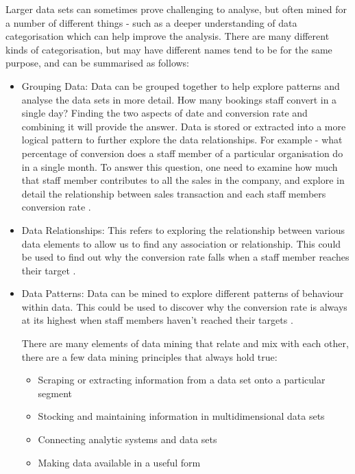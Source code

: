 Larger data sets can sometimes prove challenging to analyse, but often mined for a number of different things - such as a deeper understanding of data categorisation which can help improve the analysis. There are many different kinds of categorisation, but may have different names tend to be for the same purpose, and can be summarised as follows:

\begin{itemize}
\item Grouping Data: Data can be grouped together to help explore patterns and analyse the data sets in more detail. How many bookings staff convert in a single day? Finding the two aspects of date and conversion rate and combining it will provide the answer. Data is stored or extracted into a more logical pattern to further explore the data relationships. For example - what percentage of conversion does a staff member of a particular organisation do in a single month. To answer this question, one need to examine how much that staff member contributes to all the sales in the company, and explore in detail the relationship between sales transaction and each staff members conversion rate \cite{hedges2014statistical}.

\item Data Relationships: This refers to exploring the relationship between various data elements to allow us to find any association or relationship. This could be used to find out why the conversion rate falls when a staff member reaches their target \cite{vidulin2014combining}.

\item Data Patterns: Data can be mined to explore different patterns of behaviour within data. This could be used to discover why the conversion rate is always at its highest when staff members haven't reached their targets \cite{singh2013web}.

There are many elements of data mining that relate and mix with each other, there are a few data mining principles that always hold true:
\begin{itemize}
\item Scraping or extracting information from a data set onto a particular segment
\item Stocking and maintaining information in multidimensional data sets
\item Connecting analytic systems and data sets
\item Making data available in a useful form
\end{itemize}
\end{itemize}

